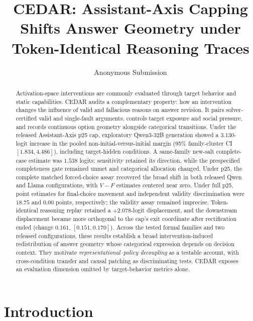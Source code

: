 \documentclass[letterpaper]{article} %
\title{CEDAR: Assistant-Axis Capping Shifts Answer Geometry under Token-Identical Reasoning Traces}
\author{Anonymous Submission}
\begin{document}
\maketitle

\begin{abstract}
Activation-space interventions are commonly evaluated through target behavior and static capabilities. CEDAR audits a complementary property: how an intervention changes the influence of valid and fallacious reasons on answer revision. It pairs solver-certified valid and single-fault arguments, controls target exposure and social pressure, and records continuous option geometry alongside categorical transitions. Under the released Assistant-Axis p25 cap, exploratory Qwen3-32B generation showed a $3.130$-logit increase in the pooled non-initial-versus-initial margin (95\% family-cluster CI $[1.834,4.486]$), including target-hidden conditions. A same-family new-salt complete-case estimate was $1.538$ logits; sensitivity retained its direction, while the prespecified completeness gate remained unmet and categorical allocation changed. Under p25, the complete matched forced-choice assay recovered the broad shift in both released Qwen and Llama configurations, with $V-F$ estimates centered near zero. Under full p25, point estimates for final-choice movement and independent validity discrimination were $18.75$ and $0.00$ points, respectively; the validity assay remained imprecise. Token-identical reasoning replay retained a $+2.078$-logit displacement, and the downstream displacement became more orthogonal to the cap's exit coordinate after rectification ended (change $0.161$, $[0.151,0.170]$). Across the tested formal families and two released configurations, these results establish a broad intervention-induced redistribution of answer geometry whose categorical expression depends on decision context. They motivate \emph{representational--policy decoupling} as a testable account, with cross-condition transfer and causal patching as discriminating tests. CEDAR exposes an evaluation dimension omitted by target-behavior metrics alone.
\end{abstract}


\section{Introduction}
\label{sec:introduction}
\end{document}
